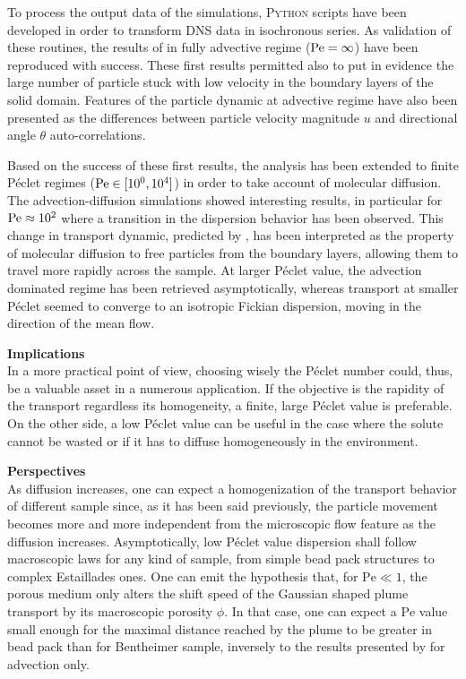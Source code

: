 To process the output data of the simulations, \textsc{Python} scripts have been developed in order to transform DNS data in isochronous series. 
As validation of these routines, the results of \citet{Meyer2016} in fully advective regime ($\mathrm{Pe}=\infty$) have been reproduced with success.
These first results permitted also to put in evidence the large number of particle stuck with low velocity in the boundary layers of the solid domain.
Features of the particle dynamic at advective regime have also been presented as the differences between particle velocity magnitude $u$ and directional angle $\theta$ auto-correlations.

Based on the success of these first results, the analysis has been extended to finite Péclet regimes ($\mathrm{Pe}\in[10^0, 10^4]$) in order to take account of molecular diffusion.
The advection-diffusion simulations showed interesting results, in particular for $\mathrm{Pe}\approx 10^2$ where a transition in the dispersion behavior has been observed.
This change in transport dynamic, predicted by \citet{Meyer2016}, has been interpreted as the property of molecular diffusion to free particles from the boundary layers, allowing them to travel more rapidly across the sample.
At larger Péclet value, the advection dominated regime has been retrieved asymptotically, whereas transport at smaller Péclet seemed to converge to an isotropic Fickian dispersion, moving in the direction of the mean flow.


\textbf{Implications}\\
In a more practical point of view, choosing wisely the Péclet number could, thus, be a valuable asset in a numerous application. If the objective is the rapidity of the transport regardless its homogeneity, a finite, large Péclet value is preferable. On the other side, a low Péclet value can be useful in the case where the solute cannot be wasted or if it has to diffuse homogeneously in the environment.

\textbf{Perspectives}\\
As diffusion increases, one can expect a homogenization of the transport behavior of different sample since, as it has been said previously, the particle movement becomes more and more independent from the microscopic flow feature as the diffusion increases.
Asymptotically, low Péclet value dispersion shall follow macroscopic laws for any kind of sample, from simple bead pack structures to complex Estaillades ones.
One can emit the hypothesis that, for $\mathrm{Pe}\ll 1$, the porous medium only alters the shift speed of the Gaussian shaped plume transport by its macroscopic porosity $\phi$. 
In that case, one can expect a $\mathrm{Pe}$ value small enough for the maximal distance reached by the plume to be greater in bead pack than for Bentheimer sample, inversely to the results presented by \cite{Meyer2016} for advection only.
